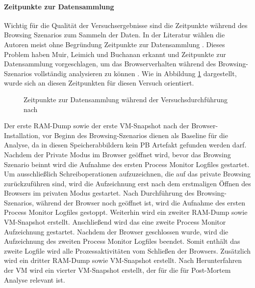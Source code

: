 \paragraph*{Zeitpunkte zur Datensammlung}
Wichtig für die Qualität der Versuchsergebnisse sind die Zeitpunkte während des Browsing Szenarios zum Sammeln der Daten.
In der Literatur wählen die Autoren meist ohne Begründung Zeitpunkte zur Datensammlung \cite{Sajan.2021, Nalawade.2016, Montasari.2015, Satvat.2014, Said.2011, Aggarwal.2010}.
Dieses Problem haben Muir, Leimich und Buchanan erkannt und Zeitpunkte zur Datensammlung vorgeschlagen, um das Browserverhalten während des Browsing-Szenarios vollständig analysieren zu können \cite{Muir.2019}. Wie in Abbildung \ref{img:zeitpunkte-datensammlung} dargestellt, wurde sich an diesen Zeitpunkten für diesen Versuch orientiert.
\begin{figure}[h!]
	\caption{Zeitpunkte zur Datensammlung während der Versuchsdurchführung nach \cite{Muir.2019}}
	\label{img:zeitpunkte-datensammlung}
	\centering
	\small
	\centerline{\resizebox{\linewidth}{!}{}}
\end{figure}

Der erste RAM-Dump sowie der erste VM-Snapshot nach der Browser-Installation, vor Beginn des Browsing-Szenarios dienen als Baseline für die Analyse, da in diesen Speicherabbildern kein PB Artefakt gefunden werden darf.
Nachdem der Private Modus im Browser geöffnet wird, bevor das Browsing Szenario beinnt wird die Aufnahme des ersten Process Monitor Logfiles gestartet. Um ausschließlich Schreiboperationen aufzuzeichnen, die auf das private Browsing zurückzuführen sind, wird die Aufzeichnung erst nach dem erstmaligen Öffnen des Browsers im privaten Modus gestartet.
Nach Durchführung des Browsing-Szenarios, während der Browser noch geöffnet ist, wird die Aufnahme des ersten Process Monitor Logfiles gestoppt. Weiterhin wird ein zweiter RAM-Dump sowie VM-Snapshot erstellt. Anschließend wird das eine zweite Process Monitor Aufzeichnung gestartet. 
Nachdem der Browser geschlossen wurde, wird die Aufzeichnung des zweiten Process Monitor Logfiles beendet. Somit enthält das zweite Logfile wird alle Prozessaktivitäten vom Schließen der Browsers. Zusätzlich wird ein dritter RAM-Dump sowie  VM-Snapshot erstellt. 
Nach Herunterfahren der VM wird ein vierter VM-Snapshot erstellt, der für die für Post-Mortem Analyse relevant ist.

